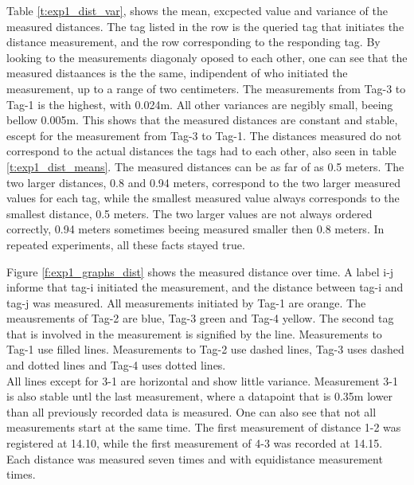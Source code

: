 Table \ref{t:exp1_dist_var}, shows the mean, excpected value and variance of the measured distances.
The tag listed in the row is the queried tag that initiates the distance measurement, and the row corresponding to the responding tag.
By looking to the measurements diagonaly oposed to each other, one can see that the measured distaances is the the same, indipendent of who initiated the measurement, up to a range of two centimeters. 
The measurements from Tag-3 to Tag-1 is the highest, with 0.024m. All other variances are negibly small, beeing bellow 0.005m.
This shows that the measured distances are constant and stable, escept for the measurement from Tag-3 to Tag-1.
The distances measured do not correspond to the actual distances the tags had to each other, also seen in table \ref{t:exp1_dist_means}.
The measured distances can be as far of as 0.5 meters.
The two larger distances, 0.8 and 0.94 meters, correspond to the two larger measured values for each tag, while the smallest measured value always corresponds to the smallest distance, 0.5 meters.
The two larger values are not always ordered correctly, 0.94 meters sometimes beeing measured smaller then 0.8 meters.
In repeated experiments, all these facts stayed true.


Figure  \ref{f:exp1_graphs_dist} shows the measured distance over time.
A label i-j informe that tag-i initiated the measurement, and the distance between tag-i and tag-j was measured.
All measurements initiated by Tag-1 are orange. The meausrements of Tag-2 are blue, Tag-3 green and Tag-4 yellow.
The second tag that is involved in the measurement is signified by the line.
Measurements to Tag-1 use filled lines. Measurements to Tag-2 use dashed lines, Tag-3 uses dashed and dotted lines and Tag-4 uses dotted lines.\\
All lines except for 3-1 are horizontal  and show little variance.
Measurement 3-1 is also stable untl the last measurement, where a datapoint that is 0.35m lower than all previously recorded data is measured.
One can also see that not all measurements start at the same time.
The first measurement of distance 1-2 was registered at 14.10, while the first measurement of 4-3 was recorded at 14.15.
Each distance was measured seven times and with equidistance measurement times.

